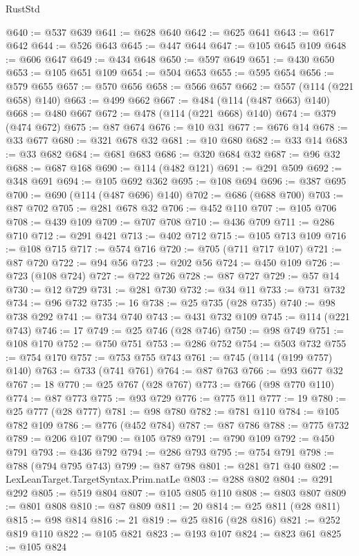 \begin{lexlean}{RustStd}
\begin{coremodule}
@640 := @537 @639
@641 := @628 @640
@642 := @625 @641
@643 := @617 @642
@644 := @526 @643
@645 := @447 @644
@647 := @105 @645 @109
@648 := @606 @647
@649 := @434 @648
@650 := @597 @649
@651 := @430 @650
@653 := @105 @651 @109
@654 := @504 @653
@655 := @595 @654
@656 := @579 @655
@657 := @570 @656
@658 := @566 @657
@662 := @557 (@114 (@221 @658) @140)
@663 := @499 @662
@667 := @484 (@114 (@487 @663) @140)
@668 := @480 @667
@672 := @478 (@114 (@221 @668) @140)
@674 := @379 (@474 @672)
@675 := @87 @674
@676 := @10 @31
@677 := @676 @14
@678 := @33 @677
@680 := @321 @678 @32
@681 := @10 @680
@682 := @33 @14
@683 := @33 @682
@684 := @681 @683
@686 := @320 @684 @32
@687 := @96 @32
@688 := @687 @168
@690 := @114 (@482 @121)
@691 := @291 @509
@692 := @348 @691
@694 := @105 @692 @362
@695 := @108 @694
@696 := @387 @695
@700 := @690 (@114 (@487 @696) @140)
@702 := @686 (@688 @700)
@703 := @87 @702
@705 := @281 @678 @32
@706 := @452 @110
@707 := @105 @706
@708 := @439 @109
@709 := @707 @708
@710 := @436 @709
@711 := @286 @710
@712 := @291 @421
@713 := @402 @712
@715 := @105 @713 @109
@716 := @108 @715
@717 := @574 @716
@720 := @705 (@711 @717 @107)
@721 := @87 @720
@722 := @94 @56
@723 := @202 @56
@724 := @450 @109
@726 := @723 (@108 @724)
@727 := @722 @726
@728 := @87 @727
@729 := @57 @14
@730 := @12 @729
@731 := @281 @730
@732 := @34 @11
@733 := @731 @732
@734 := @96 @732
@735 := 16
@738 := @25 @735 (@28 @735)
@740 := @98 @738 @292
@741 := @734 @740
@743 := @431 @732 @109
@745 := @114 (@221 @743)
@746 := 17
@749 := @25 @746 (@28 @746)
@750 := @98 @749
@751 := @108 @170
@752 := @750 @751
@753 := @286 @752
@754 := @503 @732
@755 := @754 @170
@757 := @753 @755 @743
@761 := @745 (@114 (@199 @757) @140)
@763 := @733 (@741 @761)
@764 := @87 @763
@766 := @93 @677 @32
@767 := 18
@770 := @25 @767 (@28 @767)
@773 := @766 (@98 @770 @110)
@774 := @87 @773
@775 := @93 @729
@776 := @775 @11
@777 := 19
@780 := @25 @777 (@28 @777)
@781 := @98 @780
@782 := @781 @110
@784 := @105 @782 @109
@786 := @776 (@452 @784)
@787 := @87 @786
@788 := @775 @732
@789 := @206 @107
@790 := @105 @789
@791 := @790 @109
@792 := @450 @791
@793 := @436 @792
@794 := @286 @793
@795 := @754 @791
@798 := @788 (@794 @795 @743)
@799 := @87 @798
@801 := @281 @71 @40
@802 := LexLeanTarget.TargetSyntax.Prim.natLe
@803 := @288 @802
@804 := @291 @292
@805 := @519 @804
@807 := @105 @805 @110
@808 := @803 @807
@809 := @801 @808
@810 := @87 @809
@811 := 20
@814 := @25 @811 (@28 @811)
@815 := @98 @814
@816 := 21
@819 := @25 @816 (@28 @816)
@821 := @252 @819 @110
@822 := @105 @821
@823 := @193 @107
@824 := @823 @61
@825 := @105 @824

\end{coremodule}
\end{lexlean}
